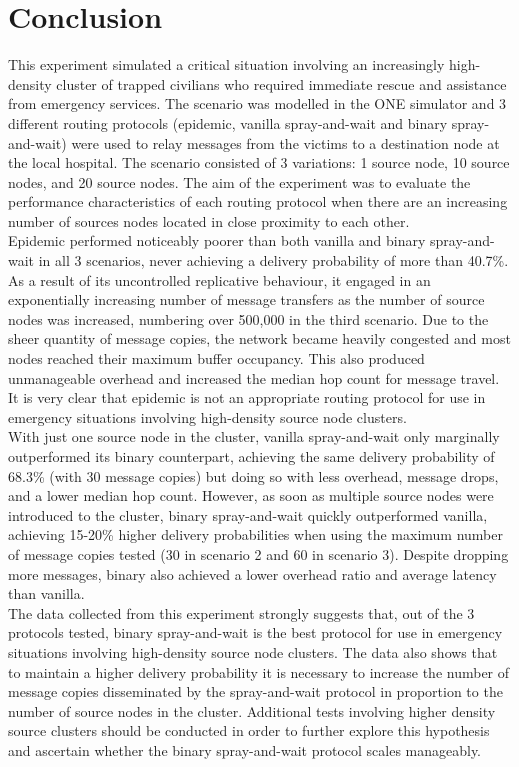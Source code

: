 \documentclass{article}
\begin{document}
\restoregeometry

\clearpage

\section{Conclusion}
This experiment simulated a critical situation involving an increasingly high-density cluster of trapped civilians who required immediate rescue and assistance from emergency services. The scenario was modelled in the ONE simulator and 3 different routing protocols (epidemic, vanilla spray-and-wait and binary spray-and-wait) were used to relay messages from the victims to a destination node at the local hospital. The scenario consisted of 3 variations: 1 source node, 10 source nodes, and 20 source nodes. The aim of the experiment was to evaluate the performance characteristics of each routing protocol when there are an increasing number of sources nodes located in close proximity to each other.\\
\newline Epidemic performed noticeably poorer than both vanilla and binary spray-and-wait in all 3 scenarios, never achieving a delivery probability of more than 40.7\%. As a result of its uncontrolled replicative behaviour, it engaged in an exponentially increasing number of message transfers as the number of source nodes was increased, numbering over 500,000 in the third scenario. Due to the sheer quantity of message copies, the network became heavily congested and most nodes reached their maximum buffer occupancy. This also produced unmanageable overhead and increased the median hop count for message travel. It is very clear that epidemic is not an appropriate routing protocol for use in emergency situations involving high-density source node clusters.\\
\newline With just one source node in the cluster, vanilla spray-and-wait only marginally outperformed its binary counterpart, achieving the same delivery probability of 68.3\% (with 30 message copies) but doing so with less overhead, message drops, and a lower median hop count. However, as soon as multiple source nodes were introduced to the cluster, binary spray-and-wait quickly outperformed vanilla, achieving 15-20\% higher delivery probabilities when using the maximum number of message copies tested (30 in scenario 2 and 60 in scenario 3). Despite dropping more messages, binary also achieved a lower overhead ratio and average latency than vanilla.\\
\newline The data collected from this experiment strongly suggests that, out of the 3 protocols tested, binary spray-and-wait is the best protocol for use in emergency situations involving high-density source node clusters. The data also shows that to maintain a higher delivery probability it is necessary to increase the number of message copies disseminated by the spray-and-wait protocol in proportion to the number of source nodes in the cluster. Additional tests involving higher density source clusters should be conducted in order to further explore this hypothesis and ascertain whether the binary spray-and-wait protocol scales manageably.
\end{document}
